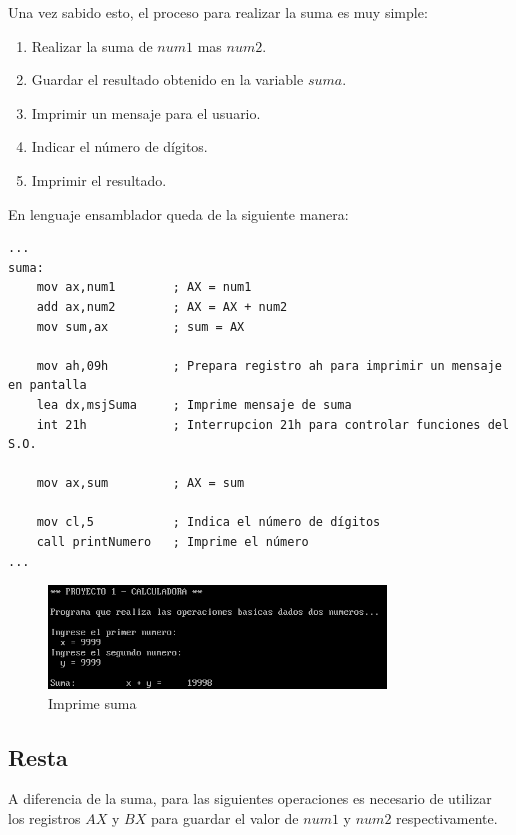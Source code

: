 \documentclass[letter,12 pt,titlepage]{article}
\begin{document}
    Una vez sabido esto, el proceso para realizar la suma es muy simple:

    \begin{enumerate}
        \item Realizar la suma de $num1$ mas $num2$.
        \item Guardar el resultado obtenido en la variable $suma$.
        \item Imprimir un mensaje para el usuario.
        \item Indicar el número de dígitos.
        \item Imprimir el resultado.
    \end{enumerate}

    En lenguaje ensamblador queda de la siguiente manera:

    \begin{verbatim}
...
suma:
    mov ax,num1        ; AX = num1
    add ax,num2        ; AX = AX + num2
    mov sum,ax         ; sum = AX

    mov ah,09h         ; Prepara registro ah para imprimir un mensaje en pantalla
    lea dx,msjSuma     ; Imprime mensaje de suma
    int 21h            ; Interrupcion 21h para controlar funciones del S.O.

    mov ax,sum         ; AX = sum

    mov cl,5           ; Indica el número de dígitos
    call printNumero   ; Imprime el número
...
    \end{verbatim}

    \begin{figure}[H]
    \centering
    \includegraphics[width=0.8\textwidth]{img/02.png}
    \caption{Imprime suma}
    \end{figure}

    \subsection{Resta}

    A diferencia de la suma, para las siguientes operaciones es necesario de utilizar los registros $AX$ y $BX$ para guardar el valor de $num1$ y $num2$ respectivamente.
\end{document}
